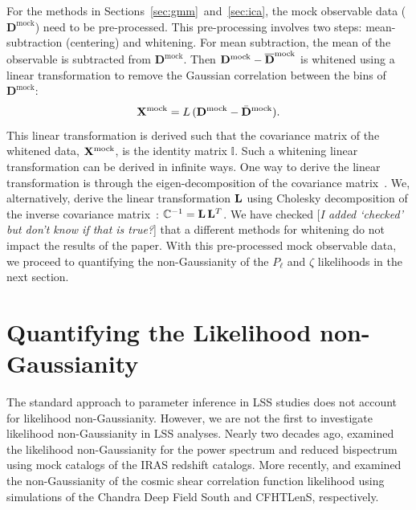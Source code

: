 \documentclass[12pt, letterpaper, preprint]{aastex}
\newcommand{\beq}{\begin{equation}}
\newcommand{\eeq}{\end{equation}}
\newcommand{\Dmock}{\mathbf{D}^\mathrm{mock}}
\newcommand{\Xmock}{{\bf X}^\mathrm{mock}}
\newcommand{\ms}[1]{{\color{orange}{\bf MS:}} {[\em #1}]}
\newcommand{\lss}{{\small{LSS}}\xspace}
\begin{document}
For the methods in Sections~\ref{sec:gmm}~and~\ref{sec:ica}, the mock 
observable data ($\Dmock$) need to be pre-processed. This pre-processing
involves two steps: mean-subtraction (centering) and whitening. For mean subtraction, 
the mean of the observable is subtracted from $\Dmock$. Then 
$\Dmock - \overline{\bf D}^\mathrm{mock}$ is whitened using a linear transformation 
to remove the Gaussian correlation between the bins of $\Dmock$: 
\beq
\Xmock = L\,(\Dmock - \bar{\bf D}^\mathrm{mock}). 
\eeq
This linear transformation is derived such that the covariance matrix of the whitened 
data, $\Xmock$, is the identity matrix $\mathbb{I}$. Such a whitening linear 
transformation can be derived in infinite ways. 
One way to derive the linear transformation is through the eigen-decomposition
of the covariance matrix~\citep[\emph{e.g.}][]{hartlap2009, sellentin2017}. We, alternatively, 
derive the linear transformation ${\bf L}$ using Cholesky decomposition of the 
inverse covariance matrix~\citep{Press:1992:NRC:148286}: 
$\mathbb{C}^{-1} = {\bf L}\,{\bf L}^T$. We have checked \ms{I added `checked'
  but don't know if that is true?} that a different methods for whitening 
do not impact the results of the paper. With this pre-processed 
mock observable data, we proceed to quantifying 
the non-Gaussianity of the $P_\ell$ and $\zeta$ likelihoods in the next section. 


\section{Quantifying the Likelihood non-Gaussianity} \label{sec:div}
The standard approach to parameter inference in \lss studies does not 
account for likelihood non-Gaussianity. 
However, we are not the first to investigate likelihood non-Gaussianity 
in \lss analyses. Nearly two decades ago, \cite{scoccimarro2000} examined 
the likelihood non-Gaussianity for the power spectrum and reduced bispectrum 
using mock catalogs of the IRAS redshift catalogs. More recently, 
\cite{hartlap2009} and \cite{sellentin2017} examined the non-Gaussianity 
of the cosmic shear correlation function likelihood using simulations of 
the Chandra Deep Field South and CFHTLenS, respectively. 
\end{document}
